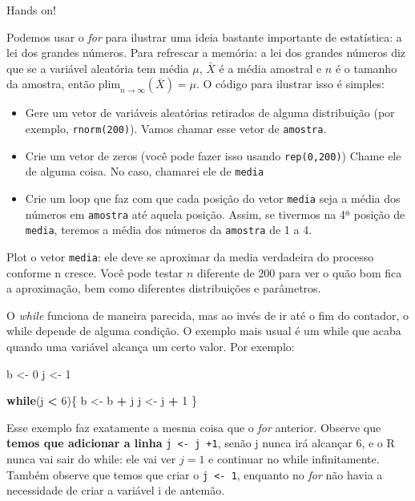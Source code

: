 \documentclass[
]{book}
\newenvironment{Shaded}{\begin{snugshade}}{\end{snugshade}}
\newcommand{\ControlFlowTok}[1]{\textcolor[rgb]{0.13,0.29,0.53}{\textbf{#1}}}
\newcommand{\DecValTok}[1]{\textcolor[rgb]{0.00,0.00,0.81}{#1}}
\newcommand{\NormalTok}[1]{#1}
\newcommand{\OperatorTok}[1]{\textcolor[rgb]{0.81,0.36,0.00}{\textbf{#1}}}
\newcommand{\StringTok}[1]{\textcolor[rgb]{0.31,0.60,0.02}{#1}}
\providecommand{\tightlist}{%
  \setlength{\itemsep}{0pt}\setlength{\parskip}{0pt}}
\begin{document}
Hands on!

Podemos usar o \emph{for} para ilustrar uma ideia bastante importante de estatística: a lei dos grandes números. Para refrescar a memória: a lei dos grandes números diz que se a variável aleatória tem média \(\mu\), \(\bar{X}\) é a média amostral e \(n\) é o tamanho da amostra, então \(\text{plim}_{n \rightarrow \infty}(\bar{X}) = \mu\). O código para ilustrar isso é simples:

\begin{itemize}
\tightlist
\item
  Gere um vetor de variáveis aleatórias retirados de alguma distribuição (por exemplo, \texttt{rnorm(200)}). Vamos chamar esse vetor de \texttt{amostra}.
\item
  Crie um vetor de zeros (você pode fazer isso usando \texttt{rep(0,200)}) Chame ele de alguma coisa. No caso, chamarei ele de \texttt{media}
\item
  Crie um loop que faz com que cada posição do vetor \texttt{media} seja a média dos números em \texttt{amostra} até aquela posição. Assim, se tivermos na 4ª posição de \texttt{media}, teremos a média dos números da \texttt{amostra} de 1 a 4.
\end{itemize}

Plot o vetor \texttt{media}: ele deve se aproximar da media verdadeira do processo conforme n cresce. Você pode testar \(n\) diferente de 200 para ver o quão bom fica a aproximação, bem como diferentes distribuições e parâmetros.

O \emph{while} funciona de maneira parecida, mas ao invés de ir até o fim do contador, o while depende de alguma condição. O exemplo mais usual é um while que acaba quando uma variável alcança um certo valor. Por exemplo:

\begin{Shaded}
\begin{Highlighting}[]
\NormalTok{b \textless{}{-}}\StringTok{ }\DecValTok{0}
\NormalTok{j \textless{}{-}}\StringTok{ }\DecValTok{1}

\ControlFlowTok{while}\NormalTok{(j }\OperatorTok{\textless{}}\StringTok{ }\DecValTok{6}\NormalTok{)\{}
\NormalTok{b \textless{}{-}}\StringTok{ }\NormalTok{b }\OperatorTok{+}\StringTok{ }\NormalTok{j}
\NormalTok{j \textless{}{-}}\StringTok{ }\NormalTok{j }\OperatorTok{+}\StringTok{ }\DecValTok{1}
\NormalTok{\}}
\end{Highlighting}
\end{Shaded}

Esse exemplo faz exatamente a mesma coisa que o \emph{for} anterior. Observe que \textbf{temos que adicionar a linha} \texttt{j\ \textless{}-\ j\ +1}, senão j nunca irá alcançar 6, e o R nunca vai sair do while: ele vai ver \(j = 1\) e continuar no while infinitamente. Também observe que temos que criar o \texttt{j\ \textless{}-\ 1}, enquanto no \emph{for} não havia a necessidade de criar a variável i de antemão.
\end{document}
